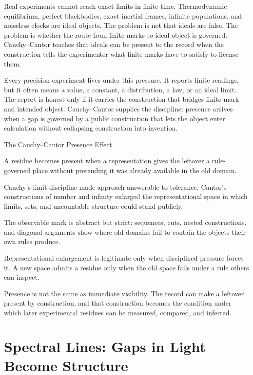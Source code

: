 Real experiments cannot reach exact limits in finite time. Thermodynamic
equilibrium, perfect blackbodies, exact inertial frames, infinite
populations, and noiseless clocks are ideal objects. The problem is not
that ideals are false. The problem is whether the route from finite
marks to ideal object is governed. Cauchy--Cantor teaches that ideals
can be present to the record when the construction tells the
experimenter what finite marks have to satisfy to license them.

Every precision experiment lives under this pressure. It reports finite
readings, but it often means a value, a constant, a distribution, a
law, or an ideal limit. The report is honest only if it carries the
construction that bridges finite mark and intended object. Cauchy--Cantor
supplies the discipline: presence arrives when a gap is governed by a
public construction that lets the object enter calculation without
collapsing construction into invention.

\begin{phenom}{The Cauchy--Cantor Presence Effect~\cite{cauchy1821,cantor1872,cantor1895v6}}
\label{ph:cauchy-cantor-presence}

\PhStatement
A residue becomes present when a representation gives the leftover a
rule-governed place without pretending it was already available in the old
domain.

\PhOrigin
Cauchy's limit discipline made approach answerable to tolerance. Cantor's
constructions of number and infinity enlarged the representational space in
which limits, sets, and uncountable structure could stand publicly.

\PhObservation
The observable mark is abstract but strict: sequences, cuts, nested
constructions, and diagonal arguments show where old domains fail to contain
the objects their own rules produce.

\PhConstraint
Representational enlargement is legitimate only when disciplined pressure
forces it. A new space admits a residue only when the old space fails under a
rule others can inspect.

\PhConsequence
Presence is not the same as immediate visibility. The record can make a
leftover present by construction, and that construction becomes the condition
under which later experimental residues can be measured, compared, and
inferred.
\end{phenom}

\section{Spectral Lines: Gaps in Light Become Structure}


